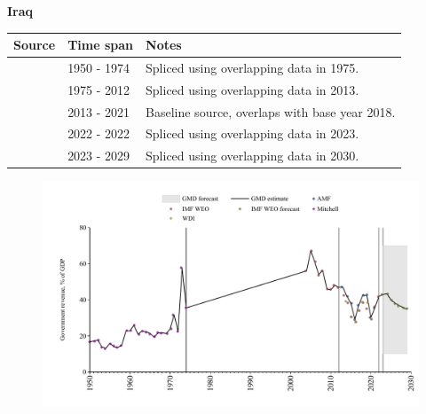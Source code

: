 \documentclass[12pt,a4paper,landscape]{article}
\begin{document}
\begin{adjustbox}{max totalsize={\paperwidth}{\paperheight},center}
\begin{minipage}[t][\textheight][t]{\textwidth}
\vspace*{0.5cm}
{}
\begin{center}
{\Large\bfseries Iraq}
\end{center}
\vspace{0.5cm}
\begin{table}[H]
\centering
\small
\begin{tabular}{|l|l|l|}
\hline
\textbf{Source} & \textbf{Time span} & \textbf{Notes} \\
\hline
\rowcolor{white}\cite{Mitchell}& 1950 - 1974 &Spliced using overlapping data in 1975.\\
\rowcolor{lightgray}\cite{IMF_WEO}& 1975 - 2012 &Spliced using overlapping data in 2013.\\
\rowcolor{white}\cite{AMF}& 2013 - 2021 &Baseline source, overlaps with base year 2018.\\
\rowcolor{lightgray}\cite{IMF_WEO}& 2022 - 2022 &Spliced using overlapping data in 2023.\\
\rowcolor{white}\cite{IMF_WEO_forecast}& 2023 - 2029 &Spliced using overlapping data in 2030.\\
\hline
\end{tabular}
\end{table}
\begin{figure}[H]
\centering
\includegraphics[width=\textwidth,height=0.6\textheight,keepaspectratio]{graphs/IRQ_govrev_GDP.pdf}
\end{figure}
\end{minipage}
\end{adjustbox}
\end{document}
